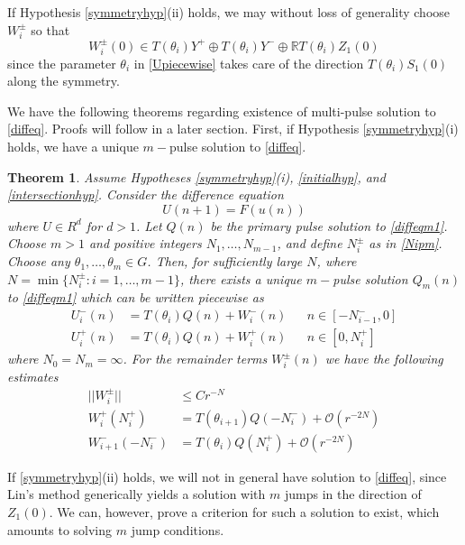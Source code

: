 \documentclass[12pt]{article}
\def\R{{\mathbb R}}
\newtheorem{theorem}{Theorem}
\begin{document}
If Hypothesis \ref{symmetryhyp}(ii) holds, we may without loss of generality choose $W_i^\pm$ so that 
\begin{equation}\label{W0loc}
W_i^\pm(0) \in T(\theta_i) Y^+ \oplus T(\theta_i) Y^- \oplus \R T(\theta_i) Z_1(0)
\end{equation}
since the parameter $\theta_i$ in \eqref{Upiecewise} takes care of the direction $T(\theta_i) S_1(0)$ along the symmetry.

We have the following theorems regarding existence of multi-pulse solution to \eqref{diffeq}. Proofs will follow in a later section. First, if Hypothesis \ref{symmetryhyp}(i) holds, we have a unique $m-$pulse solution to \eqref{diffeq}.

\begin{theorem}\label{transversemulti}
Assume Hypotheses \ref{symmetryhyp}(i), \ref{initialhyp}, and \ref{intersectionhyp}. Consider the difference equation
\begin{equation}\label{diffeqm1}
U(n+1) = F(u(n))
\end{equation}
where $U \in R^d$ for $d > 1$. Let $Q(n)$ be the primary pulse solution to \eqref{diffeqm1}. Choose $m > 1$ and positive integers $N_1, \dots, N_{m-1}$, and define $N_i^\pm$ as in \eqref{Nipm}. Choose any $\theta_1, \dots, \theta_m \in G$. Then, for sufficiently large $N$, where $N = \min\{ N_i^\pm : i = 1, \dots, m-1 \}$, there exists a unique $m-$pulse solution $Q_m(n)$ to \eqref{diffeqm1} which can be written piecewise as 
\begin{align}
U_i^-(n) &= T(\theta_i) Q(n) + W_i^-(n) && n \in [-N_{i-1}^-, 0] \\
U_i^+(n) &= T(\theta_i) Q(n) + W_i^+(n) && n \in [0, N_i^+]
\end{align}
where $N_0 = N_m = \infty$. For the remainder terms $W_i^\pm(n)$ we have the following estimates
\begin{equation}\label{Westimates}
\begin{aligned}
||W_i^\pm|| &\leq C r^{-N} \\
W_i^+(N_i^+) &= T(\theta_{i+1}) Q(-N_i^-) + \mathcal{O}(r^{-2N}) \\
W_{i+1}^-(-N_i^-) &= T(\theta_i) Q(N_i^+) + \mathcal{O}(r^{-2N})
\end{aligned}
\end{equation}
\end{theorem}

If \ref{symmetryhyp}(ii) holds, we will not in general have solution to \eqref{diffeq}, since Lin's method generically yields a solution with $m$ jumps in the direction of $Z_1(0)$. We can, however, prove a criterion for such a solution to exist, which amounts to solving $m$ jump conditions.
\end{document}
